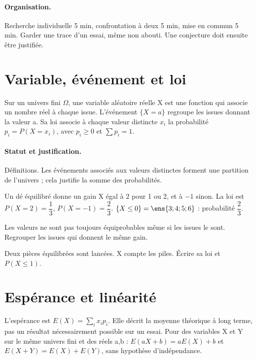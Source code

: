 \paragraph{Organisation.} Recherche individuelle 5 min, confrontation à deux 5 min, mise en commun 5 min. Garder une trace d’un essai, même non abouti. Une conjecture doit ensuite être justifiée.
\mxnewpage
\section{Variable, événement et loi}\label{C08-U1}
\begin{keypoint}
Sur un univers fini $\Omega$, une variable aléatoire réelle X est une fonction qui associe un nombre réel à chaque issue. L’événement $\{X=a\}$ regroupe les issues donnant la valeur a. Sa loi associe à chaque valeur distincte $x_i$ la probabilité $p_i=P(X=x_i)$, avec $p_i\geq0$ et $\sum p_i=1$.
\end{keypoint}
\paragraph{Statut et justification.} Définitions. Les événements associés aux valeurs distinctes forment une partition de l’univers ; cela justifie la somme des probabilités.
\begin{example}Un dé équilibré donne un gain X égal à 2 pour 1 ou 2, et à $-1$ sinon. La loi est $P(X=2)=\dfrac{1}{3}$, $P(X=-1)=\dfrac{2}{3}$. $\{X\leq0\}=\ens{3;4;5;6}$ : probabilité $\dfrac{2}{3}$.\end{example}\label{C08-EX1}
\begin{pitfall}Les valeurs ne sont pas toujours équiprobables même si les issues le sont. Regrouper les issues qui donnent le même gain.\end{pitfall}
\begin{application}Deux pièces équilibrées sont lancées. X compte les piles. Écrire sa loi et $P(X\leq1)$.\end{application}\label{C08-AP1}
\section{Espérance et linéarité}\label{C08-U2}
\begin{keypoint}
L’espérance est $E(X)=\sum_i x_ip_i$. Elle décrit la moyenne théorique à long terme, pas un résultat nécessairement possible sur un essai. Pour des variables X et Y sur le même univers fini et des réels a,b : $E(aX+b)=aE(X)+b$ et $E(X+Y)=E(X)+E(Y)$, sans hypothèse d’indépendance.
\end{keypoint}
